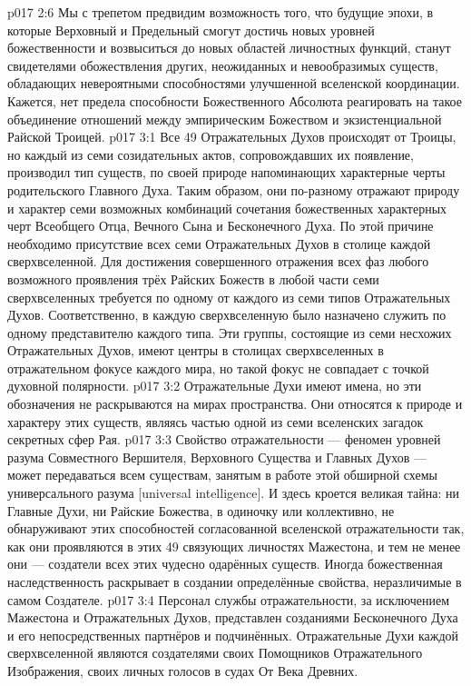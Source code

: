 \vs p017 2:6 Мы с трепетом предвидим возможность того, что будущие эпохи, в которые Верховный и Предельный смогут достичь новых уровней божественности и возвыситься до новых областей личностных функций, станут свидетелями обожествления других, неожиданных и невообразимых существ, обладающих невероятными способностями улучшенной вселенской координации. Кажется, нет предела способности Божественного Абсолюта реагировать на такое объединение отношений между эмпирическим Божеством и экзистенциальной Райской Троицей.
\vs p017 3:1 Все 49 Отражательных Духов происходят от Троицы, но каждый из семи созидательных актов, сопровождавших их появление, производил тип существ, по своей природе напоминающих характерные черты родительского Главного Духа. Таким образом, они по\hyp{}разному отражают природу и характер семи возможных комбинаций сочетания божественных характерных черт Всеобщего Отца, Вечного Сына и Бесконечного Духа. По этой причине необходимо присутствие всех семи Отражательных Духов в столице каждой сверхвселенной. Для достижения совершенного отражения всех фаз любого возможного проявления трёх Райских Божеств в любой части семи сверхвселенных требуется по одному от каждого из семи типов Отражательных Духов. Соответственно, в каждую сверхвселенную было назначено служить по одному представителю каждого типа. Эти группы, состоящие из семи несхожих Отражательных Духов, имеют центры в столицах сверхвселенных в отражательном фокусе каждого мира, но такой фокус не совпадает с точкой духовной полярности.
\vs p017 3:2 Отражательные Духи имеют имена, но эти обозначения не раскрываются на мирах пространства. Они относятся к природе и характеру этих существ, являясь частью одной из семи вселенских загадок секретных сфер Рая.
\vs p017 3:3 Свойство отражательности --- феномен уровней разума Совместного Вершителя, Верховного Существа и Главных Духов --- может передаваться всем существам, занятым в работе этой обширной схемы универсального разума [universal intelligence]. И здесь кроется великая тайна: ни Главные Духи, ни Райские Божества, в одиночку или коллективно, не обнаруживают этих способностей согласованной вселенской отражательности так, как они проявляются в этих 49 связующих личностях Мажестона, и тем не менее они --- создатели всех этих чудесно одарённых существ. Иногда божественная наследственность раскрывает в создании определённые свойства, неразличимые в самом Создателе.
\vs p017 3:4 Персонал службы отражательности, за исключением Мажестона и Отражательных Духов, представлен созданиями Бесконечного Духа и его непосредственных партнёров и подчинённых. Отражательные Духи каждой сверхвселенной являются создателями своих Помощников Отражательного Изображения, своих личных голосов в судах От Века Древних.
